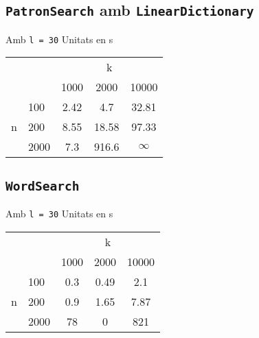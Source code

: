 ﻿\documentclass{article}
\begin{document}
\subsection{\texttt{PatronSearch} amb \texttt{LinearDictionary}}

Amb \verb|l = 30|
Unitats en s

\begin{tabular}{cl||c|c|c}
	\multicolumn{2}{c}{ } & \multicolumn{3}{c}{k} \\
	& & 1000 & 2000 & 10000 \\
	\cline{2-5}
	\multirow{3}{*}{n} 
	& 100 & 2.42 & 4.7 & 32.81 \\
	& 200 & 8.55 & 18.58 & 97.33 \\
	& 2000 & 7.3 & 916.6 & $\infty$ \\
\end{tabular}

\subsection{\texttt{WordSearch}}

Amb \verb|l = 30|
Unitats en s

\begin{tabular}{cl||c|c|c}
	\multicolumn{2}{c}{ } & \multicolumn{3}{c}{k} \\
	& & 1000 & 2000 & 10000 \\
	\cline{2-5}
	\multirow{3}{*}{n} 
	& 100 & 0.3 & 0.49 & 2.1 \\
	& 200 & 0.9 & 1.65 & 7.87 \\
	& 2000 & 78 & 0 & 821 \\
\end{tabular}
\end{document}
